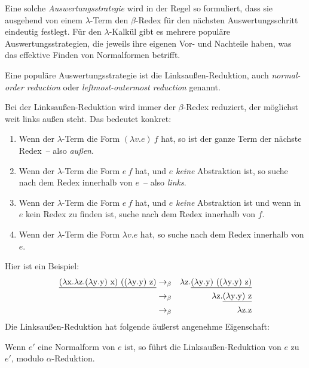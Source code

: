 Eine solche \textit{Auswertungsstrategie} wird in der Regel so
formuliert, dass sie ausgehend von einem $\lambda$-Term den 
$\beta$-Redex für den nächsten Auswertungsschritt eindeutig festlegt.
Für den $\lambda$-Kalkül gibt es mehrere
populäre Auswertungsstrategien, die jeweils ihre eigenen Vor- und
Nachteile haben, was das effektive Finden von Normalformen betrifft.

Eine populäre Auswertungsstrategie ist die Linksaußen-Reduktion, auch
\textit{normal-order reduction} oder
\textit{leftmost-outermost reduction} genannt.
%
\begin{definition}
  Bei der Linksaußen-Reduktion wird immer der $\beta$-Redex reduziert,
  der möglichst weit links außen steht.  Das bedeutet konkret:
  \begin{enumerate}
  \item Wenn der $\lambda$-Term die Form $(\lambda v.e)~f$ hat, so
    ist der ganze Term der nächste Redex~-- also \emph{außen}.
  \item Wenn der $\lambda$-Term die Form $e~f$ hat, und $e$
    \emph{keine} Abstraktion ist, so suche nach dem Redex innerhalb
    von $e$~-- also \emph{links}.
  \item Wenn der $\lambda$-Term die Form $e~f$ hat, und $e$
    \emph{keine} Abstraktion ist und wenn in $e$ kein Redex zu finden
    ist, suche nach dem Redex innerhalb von $f$.
  \item Wenn der $\lambda$-Term die Form $\lambda v.e$ hat, so suche
    nach dem Redex innerhalb von $e$.
  \end{enumerate}
\end{definition}
%
Hier ist ein Beispiel:
%
\begin{eqnarray*}
  \underline{(\lambda \mathrm x.\lambda \mathrm z.(\lambda \mathrm y.\mathrm y)~\mathrm x)~((\lambda \mathrm y.\mathrm y)~\mathrm z)}
  &  \rightarrow_\beta &
                         \lambda \mathrm z.\underline{(\lambda \mathrm y.\mathrm y)~((\lambda \mathrm y.\mathrm y)~\mathrm z)}\\
  &  \rightarrow_\beta & \lambda \mathrm z.\underline{(\lambda \mathrm y.\mathrm y)~\mathrm z}\\
  &  \rightarrow_\beta & \lambda \mathrm z.\mathrm z
\end{eqnarray*}
%
Die Linksaußen-Reduktion hat folgende äußerst angenehme Eigenschaft:
%
\begin{satz}
  Wenn $e'$ eine Normalform von $e$ ist, so führt die
  Linksaußen-Reduktion von $e$ zu $e'$, modulo $\alpha$-Reduktion.
\end{satz}
